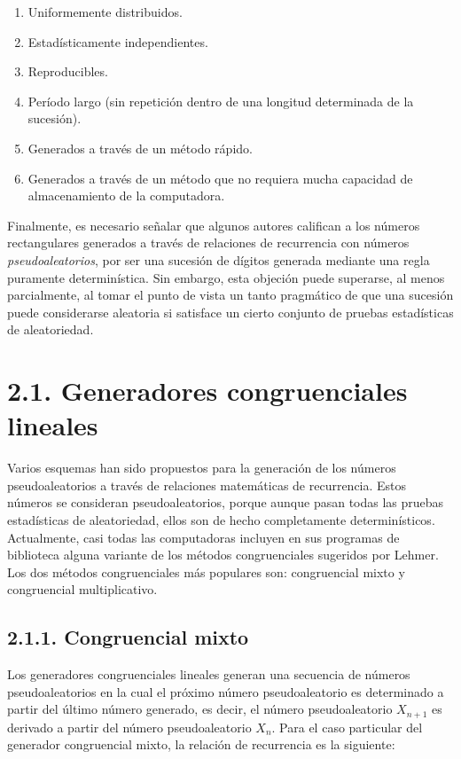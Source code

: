 \documentclass[11pt,letterpaper]{report}
\begin{document}
\begin{enumerate}
\item Uniformemente distribuidos.
\item Estadísticamente independientes.
\item Reproducibles.
\item Período largo (sin repetición dentro de una longitud determinada
de la sucesión).
\item Generados a través de un método rápido.
\item Generados a través de un método que no requiera mucha capacidad
de almacenamiento de la computadora.
\end{enumerate}

Finalmente, es necesario señalar que algunos autores califican a los
números rectangulares generados a través de relaciones de recurrencia
con números \emph{pseudoaleatorios}, por ser una sucesión de dígitos
generada mediante una regla puramente determinística. Sin embargo, esta
objeción puede superarse, al menos parcialmente, al tomar el punto de
vista un tanto pragmático de que una sucesión puede considerarse
aleatoria si satisface un cierto conjunto de pruebas estadísticas de
aleatoriedad.

\section*{2.1. Generadores congruenciales lineales}

Varios esquemas han sido propuestos para la generación de los números
pseudoaleatorios a través de relaciones matemáticas de recurrencia.
Estos números se consideran pseudoaleatorios, porque aunque pasan todas
las pruebas estadísticas de aleatoriedad, ellos son de hecho
\textcolor{BurntOrange}{completamente determinísticos}. Actualmente, casi todas las computadoras
incluyen en sus programas de biblioteca alguna variante de los métodos
congruenciales sugeridos por Lehmer. Los dos métodos congruenciales más
populares son: congruencial mixto y congruencial multiplicativo.

\subsection*{2.1.1. Congruencial mixto}

Los generadores congruenciales lineales generan una secuencia de números
pseudoaleatorios en la cual el próximo número pseudoaleatorio es
determinado a partir del último número generado, es decir, el número
pseudoaleatorio $X_{n+1}$ es derivado a partir del número pseudoaleatorio
$X_n$. Para el caso particular del generador congruencial mixto, la
relación de recurrencia es la siguiente:
\end{document}
